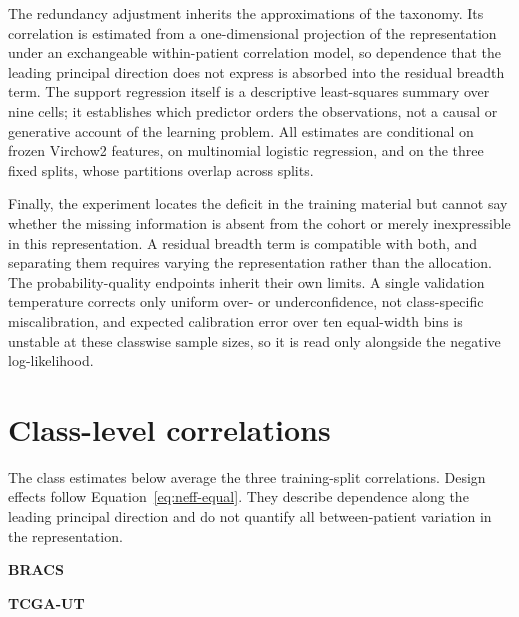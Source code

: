 \documentclass[11pt]{article}
\begin{document}
The redundancy adjustment inherits the approximations of the taxonomy. Its correlation is estimated from a one-dimensional projection of the representation under an exchangeable within-patient correlation model, so dependence that the leading principal direction does not express is absorbed into the residual breadth term. The support regression itself is a descriptive least-squares summary over nine cells; it establishes which predictor orders the observations, not a causal or generative account of the learning problem. All estimates are conditional on frozen Virchow2 features, on multinomial logistic regression, and on the three fixed splits, whose partitions overlap across splits.

Finally, the experiment locates the deficit in the training material but cannot say whether the missing information is absent from the cohort or merely inexpressible in this representation. A residual breadth term is compatible with both, and separating them requires varying the representation rather than the allocation. The probability-quality endpoints inherit their own limits. A single validation temperature corrects only uniform over- or underconfidence, not class-specific miscalibration, and expected calibration error over ten equal-width bins is unstable at these classwise sample sizes, so it is read only alongside the negative log-likelihood.


\clearpage
\appendix
\section{Class-level correlations}
The class estimates below average the three training-split correlations. Design effects follow Equation~\eqref{eq:neff-equal}. They describe dependence along the leading principal direction and do not quantify all between-patient variation in the representation.

\begin{table}[!htbp]
\centering\footnotesize
\setlength{\tabcolsep}{4pt}
\textbf{BRACS}\par\smallskip

\par\medskip
\textbf{TCGA-UT}\par\smallskip

\caption{Class-specific intraclass correlations and implied design effects at depths 8 and 32. Larger values indicate stronger projected within-patient dependence.}
\label{tab:class-iccs}
\end{table}
\clearpage
\end{document}
